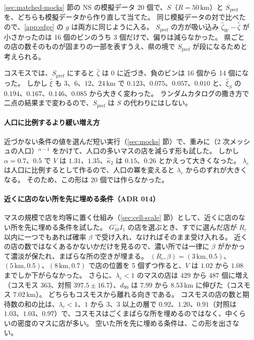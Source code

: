 \documentclass[a4paper,11pt]{ltjsarticle}
\begin{document}
\ref{sec:matched-mocks} 節の NS の模擬データ 20 個で、$S$（$R = 50\,\mathrm{km}$）と $S_{\mathrm{pref}}$ を、どちらも模擬データから作り直して当てた。
同じ模擬データの対で比べたので、\ref{app:edge} の $g$ は両方に同じように入る。
$S_{\mathrm{pref}}$ の方が吸い込み $\hat\zeta_W - \hat\zeta$ が小さかったのは 16 個のビンのうち 3 個だけで、偏りは減らなかった。
県ごとの店の数そのものが固まりの一部を表すうえ、県の境で $S_{\mathrm{pref}}$ が段になるためと考えられる。

コスモスでは、$S_{\mathrm{pref}}$ にすると $\hat\zeta$ は 0 に近づき、負のビンは 16 個から 14 個になった。
しかし $\hat\xi$ も $3$、$6$、$12$、$24\,\mathrm{km}$ で $0.123$、$0.075$、$0.057$、$0.010$ と、$\hat\xi_S$ の $0.194$、$0.167$、$0.146$、$0.085$ から大きく変わった。
ランダムカタログの撒き方で二点の結果まで変わるので、$S_{\mathrm{pref}}$ は $S$ の代わりにはしない。

\paragraph{人口に比例するより緩い増え方}
近づかない条件の値を選んだ短い実行（\ref{sec:mocks} 節）で、重みに（$2$ 次メッシュの人口）$^{\alpha - 1}$ をかけて、人口の多いマスの店を減らす形も試した。
しかし $\alpha = 0.7$、$0.5$ で $V$ は $1.31$、$1.35$、$\hat\kappa_2$ は $0.15$、$0.26$ とかえって大きくなった。
$\lambda_c$ は人口に比例するとして作るので、人口の冪を変えると $\lambda_c$ からのずれが大きくなる。
そのため、この形は 20 個では作らなかった。

\paragraph{近くに店のない所を先に埋める条件（ADR 014）}
マスの規模で店を均等に置く仕組み（\ref{sec:cell-scale} 節）として、近くに店のない所を先に埋める条件を試した。
$G_{10}^{-}I_1$ の店を選ぶとき、すでに選んだ店が $R_c$ 以内に一つでもあれば確率 $\beta$ で受け入れ、なければそのまま受け入れる。
近くの店の数ではなくあるかないかだけを見るので、濃い所では一律に $\beta$ がかかって濃淡が保たれ、まばらな所の空きが埋まる。
$(R_c, \beta) = (3\,\mathrm{km}, 0.5)$、$(5\,\mathrm{km}, 0.5)$、$(8\,\mathrm{km}, 0.7)$ で店の位置を 5 個ずつ作ると、$V$ は $1.02$ から $1.08$ までしか下がらなかった。
さらに、$\lambda_c < 1$ のマスの店は $429$ から $487$ 個に増え（コスモス $363$、対照 $397.5 \pm 16.7$）、$d_{90}$ は $7.99$ から $8.53\,\mathrm{km}$ に伸びた（コスモス $7.02\,\mathrm{km}$）。
どちらもコスモスから離れる向きである。
コスモスの店の数と期待数の和の比は、$\lambda_c < 1$、$1$ から $3$、$3$ 以上の層で $0.92$、$1.20$、$0.91$（対照は $1.03$、$1.03$、$0.97$）で、コスモスはごくまばらな所を埋めるのではなく、中くらいの密度のマスに店が多い。
空いた所を先に埋める条件は、この形を出さない。
\end{document}
